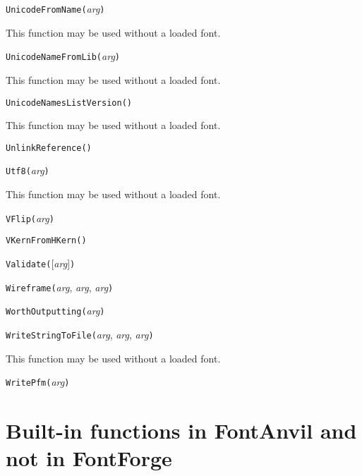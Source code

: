 
\noindent\texttt{UnicodeFromName(}\textit{arg}\texttt{)}

This function may be used without a loaded font.


\noindent\texttt{UnicodeNameFromLib(}\textit{arg}\texttt{)}

This function may be used without a loaded font.


\noindent\texttt{UnicodeNamesListVersion(}\texttt{)}

This function may be used without a loaded font.


\noindent\texttt{UnlinkReference(}\texttt{)}


\noindent\texttt{Utf8(}\textit{arg}\texttt{)}

This function may be used without a loaded font.


\noindent\texttt{VFlip(}\textit{arg}\texttt{)}


\noindent\texttt{VKernFromHKern(}\texttt{)}


\noindent\texttt{Validate(}[\textit{arg}]\texttt{)}


\noindent\texttt{Wireframe(}\textit{arg}, \textit{arg}, \textit{arg}\texttt{)}


\noindent\texttt{WorthOutputting(}\textit{arg}\texttt{)}


\noindent\texttt{WriteStringToFile(}\textit{arg}, \textit{arg}, \textit{arg}\texttt{)}

This function may be used without a loaded font.


\noindent\texttt{WritePfm(}\textit{arg}\texttt{)}

\section{Built-in functions in FontAnvil and not in FontForge}


